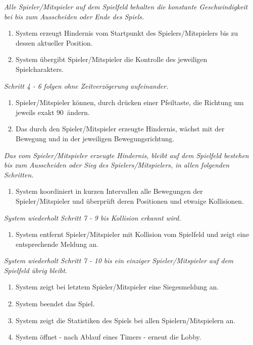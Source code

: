 \documentclass[11pt,ngerman]{article}
\begin{document}
\begin{tcolorbox}
    	\textit{Alle Spieler/Mitspieler auf dem Spielfeld behalten die konstante Geschwindigkeit bei bis zum Ausscheiden oder Ende des Spiels.}
    	\begin{enumerate}[resume]
    		\item System erzeugt Hindernis vom Startpunkt des Spielers/Mitspielers bis zu dessen aktueller Position.
    		\item System übergibt Spieler/Mitspieler die Kontrolle des jeweiligen Spielcharakters.
    	\end{enumerate}
    	\textit{Schritt 4 - 6 folgen ohne Zeitverzögerung aufeinander.}
    	\begin{enumerate}[resume]
    		\item Spieler/Mitspieler können, durch drücken einer Pfeiltaste, die Richtung um jeweils exakt 90\textdegree\ ändern.
    		\item Das durch den Spieler/Mitspieler erzeugte Hindernis, wächst mit der Bewegung und in der jeweiligen Bewegungsrichtung.
    	\end{enumerate}
    	\textit{Das vom Spieler/Mitspieler erzeugte Hindernis, bleibt auf dem Spielfeld bestehen bis zum Ausscheiden oder Sieg des Spielers/Mitspielers, in allen folgenden Schritten.}
    	\begin{enumerate}[resume]
    		\item System koordiniert in kurzen Intervallen alle Bewegungen der Spieler/Mitspieler und überprüft deren Positionen und etwaige Kollisionen.
    	\end{enumerate}
    	\textit{System wiederholt Schritt 7 - 9 bis Kollision erkannt wird.}
    	\begin{enumerate}[resume]
    		\item System entfernt Spieler/Mitspieler mit Kollision vom Spielfeld und zeigt eine entsprechende Meldung an.
    	\end{enumerate}
    	\textit{System wiederholt Schritt 7 - 10 bis ein einziger Spieler/Mitspieler auf dem Spielfeld übrig bleibt.}
    	\begin{enumerate}[resume]
    		\item System zeigt bei letztem Spieler/Mitspieler eine Siegesmeldung an.
    		\item System beendet das Spiel.
    		\item System zeigt die Statistiken des Spiels bei allen Spielern/Mitspielern an.
    		\item System öffnet - nach Ablauf eines Timers  - erneut die \Gls{Lobby}.
    	\end{enumerate}

    \end{tcolorbox}
\end{document}
